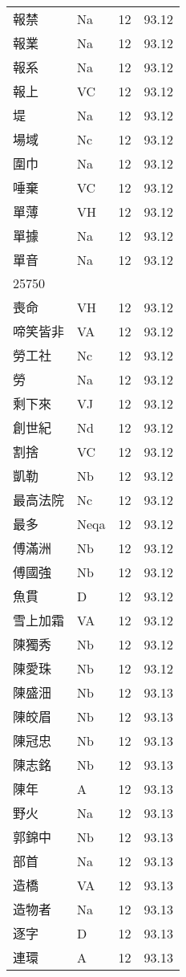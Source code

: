 \documentclass[twocolumn]{book}
\begin{document}
\begin{supertabular}{llrr}
報禁 & Na & 12 &  93.12\\
報業 & Na & 12 &  93.12\\
報系 & Na & 12 &  93.12\\
報上 & VC & 12 &  93.12\\
堤 & Na & 12 &  93.12\\
場域 & Nc & 12 &  93.12\\
圍巾 & Na & 12 &  93.12\\
唾棄 & VC & 12 &  93.12\\
單薄 & VH & 12 &  93.12\\
單據 & Na & 12 &  93.12\\
單音 & Na & 12 &  93.12\\
25750\\
喪命 & VH & 12 &  93.12\\
啼笑皆非 & VA & 12 &  93.12\\
勞工社 & Nc & 12 &  93.12\\
勞 & Na & 12 &  93.12\\
剩下來 & VJ & 12 &  93.12\\
創世紀 & Nd & 12 &  93.12\\
割捨 & VC & 12 &  93.12\\
凱勒 & Nb & 12 &  93.12\\
最高法院 & Nc & 12 &  93.12\\
最多 & Neqa & 12 &  93.12\\
傅滿洲 & Nb & 12 &  93.12\\
傅國強 & Nb & 12 &  93.12\\
魚貫 & D & 12 &  93.12\\
雪上加霜 & VA & 12 &  93.12\\
陳獨秀 & Nb & 12 &  93.12\\
陳愛珠 & Nb & 12 &  93.12\\
陳盛沺 & Nb & 12 &  93.13\\
陳皎眉 & Nb & 12 &  93.13\\
陳冠忠 & Nb & 12 &  93.13\\
陳志銘 & Nb & 12 &  93.13\\
陳年 & A & 12 &  93.13\\
野火 & Na & 12 &  93.13\\
郭錦中 & Nb & 12 &  93.13\\
部首 & Na & 12 &  93.13\\
造橋 & VA & 12 &  93.13\\
造物者 & Na & 12 &  93.13\\
逐字 & D & 12 &  93.13\\
連環 & A & 12 &  93.13\\

\end{supertabular}
\end{document}

